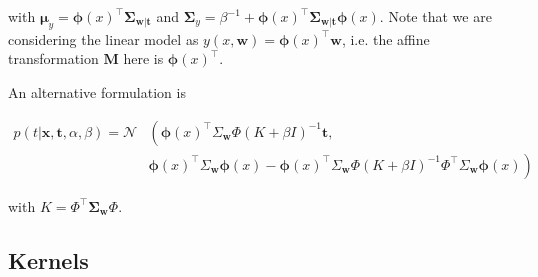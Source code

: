 \documentclass[11pt]{article} %
\begin{document}
with $\boldsymbol{\mu}_y = \boldsymbol{\phi}(x)^\top \boldsymbol{\Sigma}_{\mathbf{w} | \mathbf{t}}$ and $\boldsymbol{\Sigma}_y = \beta^{-1} + \boldsymbol{\phi}(x)^\top \boldsymbol{\Sigma}_{\mathbf{w} | \mathbf{t}}\boldsymbol{\phi}(x)$. Note that we are considering the linear model as $y(x,\mathbf{w}) = \boldsymbol{\phi}(x)^\top \mathbf{w}$, i.e. the affine transformation $\mathbf{M}$ here is $\boldsymbol{\phi}(x)^\top$.

An alternative formulation \cite{Rasmussen:2005:GPM:1162254} is

\begin{equation}
\begin{aligned}
      p(t | \mathbf{x}, \mathbf{t}, \alpha, \beta) = \mathcal{N} & \left(  \boldsymbol{\phi}(x)^{\top} \Sigma_\mathbf{w} \Phi\left(K+\beta I\right)^{-1} \mathbf{t} \right., \\ &\left.\boldsymbol{\phi}(x)^{\top} \Sigma_\mathbf{w} \boldsymbol{\phi}(x)-\boldsymbol{\phi}(x)^{\top} \Sigma_\mathbf{w} \Phi\left(K+\beta I\right)^{-1} \Phi^{\top} \Sigma_\mathbf{w} \boldsymbol{\phi}(x)\right)
\end{aligned}
\end{equation}

with $K=\Phi^{\top} \boldsymbol{\Sigma}_\mathbf{w} \Phi$.

\subsection{Kernels}
\end{document}
